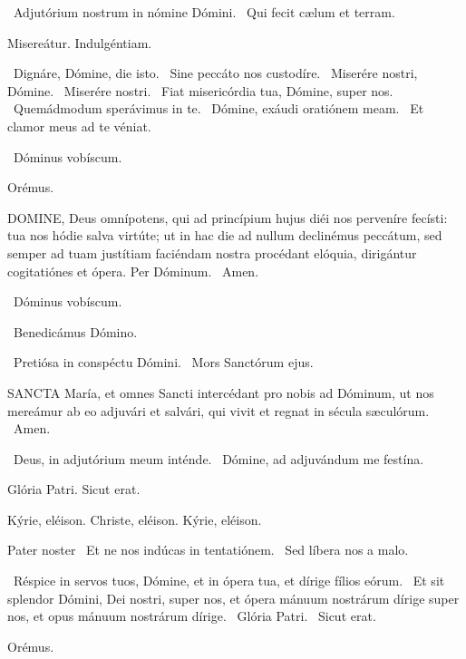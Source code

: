 
\V\ Adjutórium nostrum in nómine Dómini. \R\ Qui fecit cælum et terram.

 Misereátur. Indulgéntiam.

\V\ Dignáre, Dómine, die isto. \R\ Sine peccáto nos custodíre. \V\ Miserére nostri, Dómine. \R\ Miserére nostri. \V\ Fiat misericórdia tua, Dómine, super nos. \R\ Quemádmodum sperávimus in te. \V\ Dómine, exáudi oratiónem meam. \R\ Et clamor meus ad te véniat.

\sectionornament

\V\ Dóminus vobíscum.

Orémus. 

\lettrine[lines=2]{D}{OMINE}, Deus omnípotens, qui ad princípium hujus diéi nos perveníre fecísti: tua nos hódie salva virtúte; ut in hac die ad nullum declinémus peccátum, sed semper ad tuam justítiam faciéndam nostra procédant elóquia, dirigántur cogitatiónes et ópera. Per Dóminum. \R\ Amen.

\V\ Dóminus vobíscum.

\V\ Benedicámus Dómino.


\V\ Pretiósa in conspéctu Dómini. \R\ Mors Sanctórum ejus.



\lettrine[lines=2]{S}{ANCTA} María, et omnes Sancti intercédant pro nobis ad Dóminum, ut nos mereámur ab eo adjuvári et salvári, qui vivit et regnat in sécula sæculórum. \R\ Amen.

\V\ Deus, in adjutórium meum inténde. \R\ Dómine, ad adjuvándum me festína.

 Glória Patri. Sicut erat.

Kýrie, eléison. Christe, eléison. Kýrie, eléison.

Pater noster  \V\ Et ne nos indúcas in tentatiónem. \R\ Sed líbera nos a malo.

\V\ Réspice in servos tuos, Dómine, et in ópera tua, et dírige fílios eórum. \R\ Et sit splendor Dómini, Dei nostri, super nos, et ópera mánuum nostrárum dírige super nos, et opus mánuum nostrárum dírige. \V\ Glória Patri. \R\ Sicut erat.

Orémus. 

